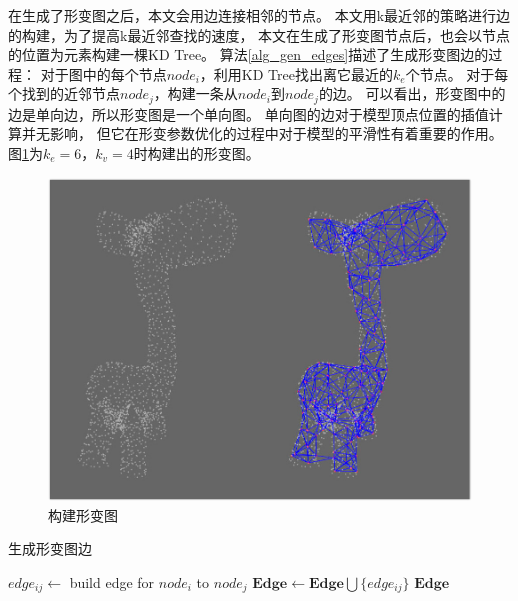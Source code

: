 在生成了形变图之后，本文会用边连接相邻的节点。
本文用k最近邻的策略进行边的构建，为了提高k最近邻查找的速度，
本文在生成了形变图节点后，也会以节点的位置为元素构建一棵KD Tree。
算法\ref{alg_gen_edges}描述了生成形变图边的过程：
对于图中的每个节点$node_i$，利用KD Tree找出离它最近的$k_e$个节点。
对于每个找到的近邻节点$node_j$，构建一条从$node_i$到$node_j$的边。
可以看出，形变图中的边是单向边，所以形变图是一个单向图。
单向图的边对于模型顶点位置的插值计算并无影响，
但它在形变参数优化的过程中对于模型的平滑性有着重要的作用。
图\ref{build_graph}为$k_e=6$，$k_v=4$时构建出的形变图。
\begin{figure}[]
    \centering
    \includegraphics[width = \textwidth]{./Pictures/build_graph.jpg}
    \caption{构建形变图}
    \label{build_graph}
\end{figure}
\begin{algorithm}
    \caption{生成形变图边}
    \label{alg_gen_edges}
    \begin{algorithmic}[1]
                    \State $edge_{ij} \gets$ build edge for $node_i$ to $node_j$
                    \State $\bm{Edge} \gets \bm{Edge} \bigcup \{edge_{ij}\}$
                \EndFor
            \EndFor
            \State \Return $\bm{Edge}$
        \EndFunction
    \end{algorithmic}
\end{algorithm} 

